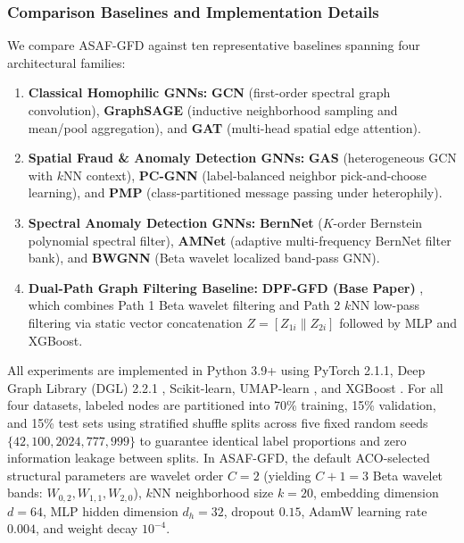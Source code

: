 \documentclass[10pt,a4paper,twocolumn]{article}
\begin{document}
\subsubsection{Comparison Baselines and Implementation Details}

We compare ASAF-GFD against ten representative baselines spanning four architectural families:

\begin{enumerate}
  \item \textbf{Classical Homophilic GNNs:} \textbf{GCN} \cite{ref45} (first-order spectral graph convolution), \textbf{GraphSAGE} \cite{ref46} (inductive neighborhood sampling and mean/pool aggregation), and \textbf{GAT} \cite{ref47} (multi-head spatial edge attention).
  \item \textbf{Spatial Fraud \& Anomaly Detection GNNs:} \textbf{GAS} \cite{ref35} (heterogeneous GCN with $k$NN context), \textbf{PC-GNN} \cite{ref48} (label-balanced neighbor pick-and-choose learning), and \textbf{PMP} \cite{ref49} (class-partitioned message passing under heterophily).
  \item \textbf{Spectral Anomaly Detection GNNs:} \textbf{BernNet} \cite{ref30} ($K$-order Bernstein polynomial spectral filter), \textbf{AMNet} \cite{ref50} (adaptive multi-frequency BernNet filter bank), and \textbf{BWGNN} \cite{ref32} (Beta wavelet localized band-pass GNN).
  \item \textbf{Dual-Path Graph Filtering Baseline:} \textbf{DPF-GFD (Base Paper)} \cite{ref9}, which combines Path 1 Beta wavelet filtering and Path 2 $k$NN low-pass filtering via static vector concatenation $Z = [Z_{1i} \parallel Z_{2i}]$ followed by MLP and XGBoost.
\end{enumerate}

All experiments are implemented in Python 3.9+ using PyTorch 2.1.1, Deep Graph Library (DGL) 2.2.1 \cite{ref51}, Scikit-learn, UMAP-learn \cite{ref52}, and XGBoost \cite{ref39}. For all four datasets, labeled nodes are partitioned into 70\% training, 15\% validation, and 15\% test sets using stratified shuffle splits across five fixed random seeds $\{42, 100, 2024, 777, 999\}$ to guarantee identical label proportions and zero information leakage between splits. In ASAF-GFD, the default ACO-selected structural parameters are wavelet order $C = 2$ (yielding $C+1 = 3$ Beta wavelet bands: $W_{0,2}, W_{1,1}, W_{2,0}$), $k$NN neighborhood size $k = 20$, embedding dimension $d = 64$, MLP hidden dimension $d_h = 32$, dropout $0.15$, AdamW learning rate $0.004$, and weight decay $10^{-4}$.
\end{document}

